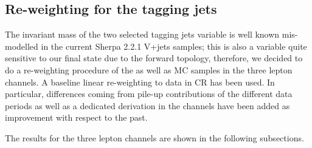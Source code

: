 
\subsection{Re-weighting for the tagging jets}
\label{subsec:mjj_reweight}

The invariant mass of the two selected tagging jets variable is well known mis-modelled in the current Sherpa 2.2.1 V+jets samples; 
this is also a variable quite sensitive to our final state due to the forward topology, 
therefore, we decided to do a re-weighting procedure of the \Wjets as well as \Zjets MC samples in the three lepton channels.
A baseline linear re-weighting to data in CR has been used.
In particular, differences coming from pile-up contributions of the different data periods as well as a dedicated derivation in the \zlep channels have been added as improvement with respect to the past.

The results for the three lepton channels are shown in the following subsections.


